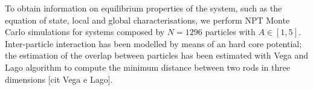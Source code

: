\documentclass[journal=jacsat,manuscript=article]{achemso}
\begin{document}
To obtain information on equilibrium properties of the system, such as the equation of state, local and global characterisations, we perform NPT Monte Carlo simulations for systems composed by $N = 1296$ particles with $A \in [1, 5]$. Inter-particle interaction has been modelled by means of an hard core potential; the estimation of the overlap between particles has been estimated with Vega and Lago algorithm to compute the minimum distance between two rods in three dimensions [cit Vega e Lago].

\end{document}

